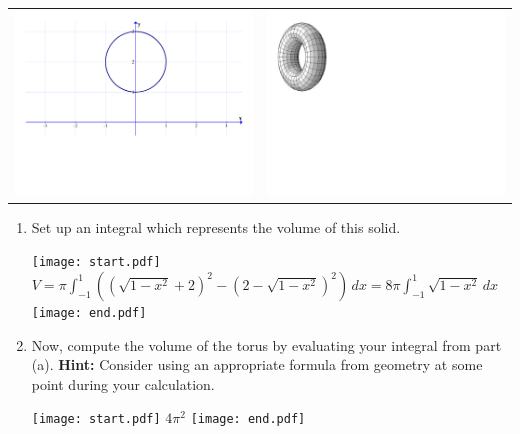 \documentclass[12pt]{article}
\begin{document}
\begin{enumerate}
\begin{center}
\begin{tabular}{cc}
\includegraphics[scale=0.4]{circle.pdf}&\includegraphics[scale=.7]{torus.pdf}
\end{tabular}
\end{center}

\begin{enumerate}

\item  Set up an integral which represents the volume of this solid.

\texttt{[image: start.pdf]}
{{$V=\pi \int_{-1}^1 \left(\left(\sqrt{1-x^2}+2\right)^2-\left(2-\sqrt{1-x^2}\right)^2\right)\,dx=8\pi\int_{-1}^1 \sqrt{1-x^2} \,dx$}}
\texttt{[image: end.pdf]}


\item Now, compute the volume of the torus by evaluating your integral from part (a).  {\bf Hint:} Consider using an appropriate formula from geometry at some point during your calculation.

\texttt{[image: start.pdf]}
{{$4\pi^2$}}
\texttt{[image: end.pdf]}


\end{enumerate}

\end{enumerate}
\end{document}
